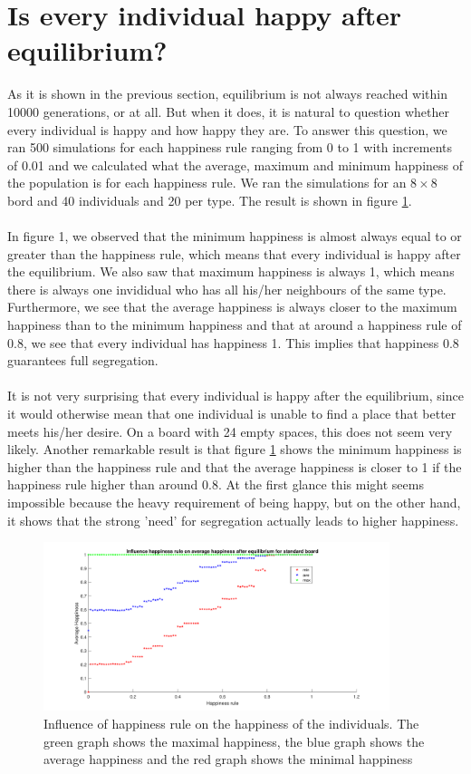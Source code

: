 
\section{Is every individual happy after equilibrium?}
As it is shown in the previous section, equilibrium is not always reached within 10000 generations, or at all. But when it does, it is natural to question whether every individual is happy and how happy they are. To answer this question, we ran 500 simulations for each happiness rule ranging from 0 to 1 with increments of 0.01 and we calculated what the average, maximum and minimum happiness of the population is for each happiness rule. We ran the simulations for an $8\times 8$ bord and 40 individuals and 20 per type. The result is shown in figure \ref{happyhappy}.\\
\\
In figure 1, we observed that the minimum happiness is almost always equal to or greater than the happiness rule, which means that every individual is happy after the equilibrium. We also saw that maximum happiness is always 1, which means there is always one invididual who has all his/her neighbours of the same type. Furthermore, we see that the average happiness is always closer to the maximum happiness than to the minimum happiness and that at around a happiness rule of 0.8, we see that every individual has happiness 1. This implies that happiness 0.8 guarantees full segregation.\\
\\
It is not very surprising that every individual is happy after the equilibrium, since it would otherwise mean that one individual is unable to find a place that better meets his/her desire. On a board with 24 empty spaces, this does not seem very likely. Another remarkable result is that figure \ref{happyhappy} shows the minimum happiness is higher than the happiness rule and that the average happiness is closer to 1 if the happiness rule higher than around 0.8. At the first glance this might seems impossible because the heavy requirement of being happy, but on the other hand, it shows that the strong 'need' for segregation actually leads to higher happiness.
\begin{figure}[h!]
    \centering
    \includegraphics[width=0.9\textwidth]{happinessregel-gemhappinesseind-2}
    \caption{Influence of happiness rule on the happiness of the individuals. The green graph shows the maximal happiness, the blue graph shows the average happiness and the red graph shows the minimal happiness}
    \label{happyhappy}
\end{figure}
